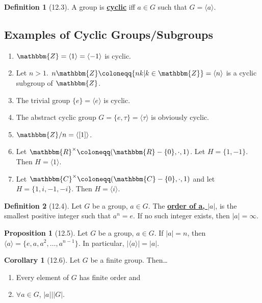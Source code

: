 \documentclass{article}
\newcommand{\Z}{\mathbbm{Z}}
\newcommand{\R}{\mathbbm{R}}
\newcommand{\C}{\mathbbm{C}}
\newcommand{\coleq}{\coloneqq}
\newcommand{\define}[1]{\textbf{\underline{#1}}}
\theoremstyle{definition}
\newtheorem*{defn}{Definition}
\newtheorem*{cor}{Corollary}
\newtheorem*{prop}{Proposition}
\theoremstyle{remark}
\newcommand{\cyc}[1]{\langle#1\rangle}
\begin{document}
{{        \begin{defn}[12.3]
            A group is \define{cyclic} iff $a \in G$ such that $G=\cyc{a}$.
        \end{defn}
        }
        
        \subsection*{Examples of Cyclic Groups/Subgroups}{
            \begin{enumerate}
                \item $\Z=\cyc{1}=\cyc{-1}$ is cyclic.
                \item Let $n>1$. $n\Z\coleq\{nk|k\in\Z\}=\cyc{n}$ is a cyclic subgroup of $\Z$.
                \item The trivial group $\{e\}=\cyc{e}$ is cyclic.
                \item The abstract cyclic group $G=\{e,\tau\}=\cyc{\tau}$ is obviously cyclic.
                \item $\Z/n=\cyc{[1]}$.
                \item Let $\R^\times\coleq(\R-\{0\},\cdot,1)$. Let $H=\{1,-1\}$. Then $H=\cyc{1}$.
                \item Let $\C^\times\coleq(\C-\{0\},\cdot, 1)$ and let $H=\{1,i,-1,-i\}$. Then $H=\cyc{i}$.
            \end{enumerate}
            
            \begin{defn}[12.4]
                Let $G$ be a group, $a\in G$. The \define{order of a, $|a|$}, is the smallest positive integer such that $a^n=e$. If no such integer exists, then $|a|=\infty$.
            \end{defn}
            
            \begin{prop}[12.5]
                Let $G$ be a group, $a\in G$. If $|a|=n$, then $\cyc{a}=\{e,a,a^2,\ldots,a^{n-1}\}$. In particular, $|\cyc{a}|=|a|$.
            \end{prop}
            
            \begin{cor}[12.6]
                Let $G$ be a finite group. Then\ldots
                \begin{enumerate}
                    \item Every element of $G$ has finite order and
                    \item $\forall a \in G$, $|a|\big||G|$.
                \end{enumerate}
            \end{cor}
        }
    }    
    
\end{document}
